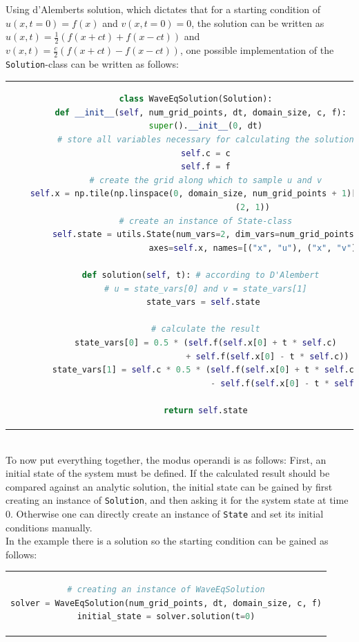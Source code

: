 Using d'Alemberts solution, which dictates that for a starting condition of $u(x,t=0)=f(x)$ and $v(x,t=0)=0$, the solution can be written as $u(x,t)=\frac{1}{2}(f(x+ct)+f(x-ct))$ and $v(x,t)=\frac{c}{2}(f(x+ct)-f(x-ct))$, one possible implementation of the \texttt{Solution}-class can be written as follows:\\
\begin{tabular}{c}
\begin{lstlisting}[language=Python]
class WaveEqSolution(Solution):
  def __init__(self, num_grid_points, dt, domain_size, c, f):
    super().__init__(0, dt)
    # store all variables necessary for calculating the solution
    self.c = c
    self.f = f
    # create the grid along which to sample u and v
    self.x = np.tile(np.linspace(0, domain_size, num_grid_points + 1)[:-1],
                       (2, 1))
    # create an instance of State-class
    self.state = utils.State(num_vars=2, dim_vars=num_grid_points,
                         axes=self.x, names=[("x", "u"), ("x", "v")])

  def solution(self, t): # according to D'Alembert
    # u = state_vars[0] and v = state_vars[1]
    state_vars = self.state 
        
    # calculate the result
    state_vars[0] = 0.5 * (self.f(self.x[0] + t * self.c)
                             + self.f(self.x[0] - t * self.c))
    state_vars[1] = self.c * 0.5 * (self.f(self.x[0] + t * self.c)
                                       - self.f(self.x[0] - t * self.c))

    return self.state
\end{lstlisting}
\end{tabular}
\\
To now put everything together, the modus operandi is as follows:
First, an initial state of the system must be defined.
If the calculated result should be compared against an analytic solution, the initial state can be gained by first creating an instance of \texttt{Solution}, and then asking it for the system state at time $0$.
Otherwise one can directly create an instance of \texttt{State} and set its initial conditions manually.
\\
In the example there is a solution so the starting condition can be gained as follows:\\
\begin{tabular}{c}
\begin{lstlisting}[language=Python]
# creating an instance of WaveEqSolution
solver = WaveEqSolution(num_grid_points, dt, domain_size, c, f)
initial_state = solver.solution(t=0)
\end{lstlisting}
\end{tabular}
